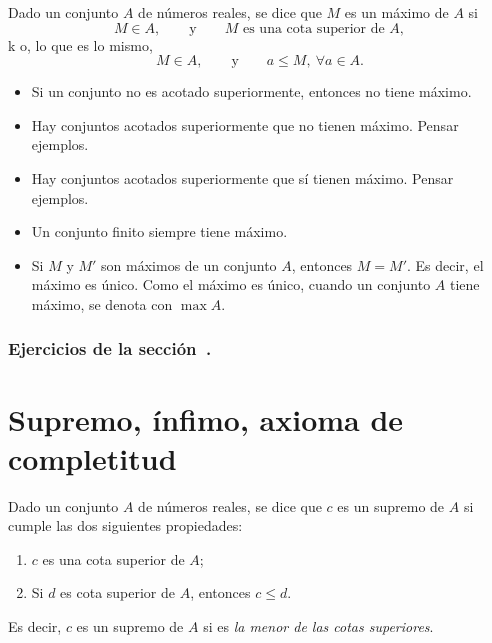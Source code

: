 \begin{definition}
    Dado un conjunto $A$ de números reales, se dice que $M$ es un máximo de $A$ si
    \[ M\in A,\qquad \text{y} \qquad M\text{ es una cota superior de $A$}, \]k
    o, lo que es lo mismo,
    \[ M\in A,\qquad \text{y} \qquad a\le M,\ \forall a\in A. \]
\end{definition}

\begin{itemize}
    \item Si un conjunto no es acotado superiormente, entonces no tiene máximo.
    \item Hay conjuntos acotados superiormente que no tienen máximo. Pensar ejemplos.
    \item Hay conjuntos acotados superiormente que sí tienen máximo. Pensar ejemplos.
    \item Un conjunto finito siempre tiene máximo.
    \item Si $M$ y $M'$ son máximos de un conjunto $A$, entonces $M=M'$. Es decir, el máximo es único.
    Como el máximo es único, cuando un conjunto $A$ tiene máximo, se denota con $\max A$.
\end{itemize}

\subsubsection*{Ejercicios de la sección~.}

\begin{enumerate}

\end{enumerate}

\section{Supremo, ínfimo, axioma de completitud}

\begin{definition}
    Dado un conjunto $A$ de números reales, se dice que $c$ es un supremo de $A$ si cumple las dos siguientes propiedades:
    \begin{enumerate}[{\rm(i)}]
        \item $c$ es una cota superior de $A$;
        \item Si $d$ es cota superior de $A$, entonces $c \le d$.
    \end{enumerate}
    Es decir, $c$ es un supremo de $A$ si es \emph{la menor de las cotas superiores}.

\end{definition}


